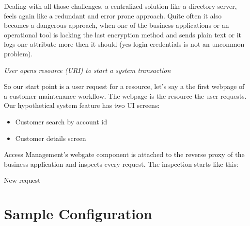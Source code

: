 Dealing with all those challenges, a centralized solution like a
directory server, feels again like a redundant and error prone approach.
Quite often it also becomes a dangerous approach, when one of the
business applications or an operational tool is lacking the last
encryption method and sends plain text or it logs one attribute more
then it should (yes login credentials is not an uncommon problem).







\emph{User opens resource (URI) to start a system transaction}

So our start point is a user request for a resource, let's say a the first webpage of a customer maintenance workflow. The webpage is the resource the user requests. Our hypothetical system feature has two UI screens:

\begin{itemize}
    \item Customer search by account id
    \item Customer details screen
\end{itemize}

Access Management's webgate component is attached to the reverse proxy of the business application and inspects every request. The inspection starts like this:

New request 


\section{Sample Configuration}


